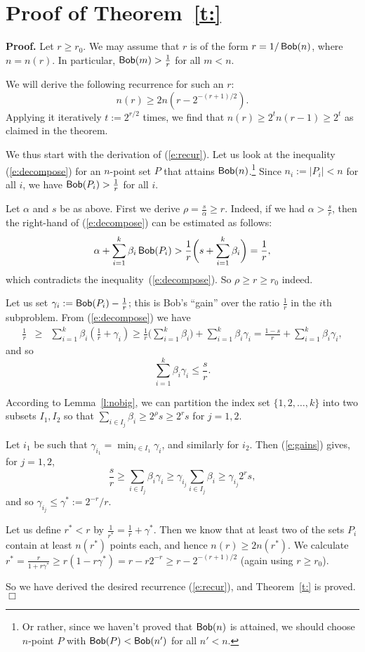 \documentclass[11pt]{article}
\DeclareMathOperator{\bob}{{\sf Bob}}
\newcommand{\qed}{\hspace{\stretch{1}}$\Box$}
\newenvironment{proof}{\vspace{-.25\baselineskip}\noindent\textbf{Proof.}
}{\qed\par\medskip}
\begin{document}
\section{Proof of Theorem~\ref{t:}}
\begin{proof}Let $r\ge r_0$.
We may assume that $r$ is of the form $r=1/\bob(n)$,
where $n=n(r)$. In particular, $\bob(m)>\frac 1r$ for all $m<n$.

We will derive the following recurrence for such an $r$:
\begin{equation}\label{e:recur}
n(r)\ge 2 n(r-2^{-(r+1)/2}).
\end{equation}
Applying it iteratively $t:=2^{r/2}$ times, we find that
$n(r)\ge 2^t n(r-1)\ge 2^t$ as claimed in the theorem.

We thus start with the derivation of (\ref{e:recur}).
Let us look at the inequality (\ref{e:decompose}) for an $n$-point set $P$
that attains $\bob(n)$.\footnote{Or rather,
since we haven't proved that $\bob(n)$
is attained, we should choose $n$-point $P$
with  $\bob(P)<\bob(n')$ for all $n'<n$.}
Since $n_i:=|P_i|<n$ for all $i$, we have
$\bob(P_i)>\frac 1r$ for all $i$. 

Let $\alpha$ and $s$ be as above.
First we derive $\rho=\frac s\alpha\ge r$.
Indeed, if we had $\alpha>\frac sr$, then the right-hand of 
(\ref{e:decompose}) can be estimated as follows:
$$
\alpha+\sum_{i=1}^k \beta_i \bob(P_i)> 
\frac 1r\biggl(s+\sum_{i=1}^k\beta_i\biggr)=
\frac1r,
$$
which contradicts the inequality~(\ref{e:decompose}).
So $\rho\ge r\ge r_0$ indeed.



Let us set $\gamma_i :=
\bob(P_i)-\frac 1r$; this is Bob's ``gain'' over the ratio $\frac 1r$
in the $i$th subproblem. From (\ref{e:decompose}) we have
\begin{eqnarray*}
\frac 1r&\ge& \sum_{i=1}^k\beta_i\left(\frac 1r+\gamma_i\right)
\ge \frac 1r\biggl( \sum_{i=1}^k\beta_i\biggr)+\sum_{i=1}^k\beta_i\gamma_i
=\frac {1-s}r +\sum_{i=1}^k\beta_i\gamma_i,
\end{eqnarray*}
and so
\begin{equation}\label{e:gains}
\sum_{i=1}^k\beta_i\gamma_i\le \frac sr.
\end{equation}

According to Lemma~\ref{l:nobig}, we can partition the index set
$\{1,2,\ldots,k\}$ into two subsets $I_1,I_2$ so that
$\sum_{i\in I_j}\beta_i\ge 2^\rho s \ge 2^r s$ for $j=1,2$. 


Let $i_1$ be such that $\gamma_{i_1}=\min_{i\in I_1}\gamma_i$, and
similarly for $i_2$. Then (\ref{e:gains}) gives, for $j=1,2$,
$$
\frac sr \ge \sum_{i\in I_j}\beta_i\gamma_i\ge \gamma_{i_j}\sum_{i\in I_j}\beta_i\ge \gamma_{i_j} 2^r s,
$$
and so $\gamma_{i_j}\le \gamma^*:= 2^{-r}/r$.

Let us define $r^*<r$ by $\frac 1{r^*}=\frac1r+\gamma^*$.
Then we know that at least two of the sets $P_i$ contain at least
$n(r^*)$ points each, and hence $n(r)\ge 2 n(r^*)$.
We calculate $r^*=\frac r{1+r\gamma^*}\ge r(1-r\gamma^*)= r-r2^{-r}\ge
r-2^{-(r+1)/2}$ (again using $r\ge r_0$).

So we have derived the desired recurrence (\ref{e:recur}),
and Theorem~\ref{t:} is proved.
\end{proof}
\end{document}
